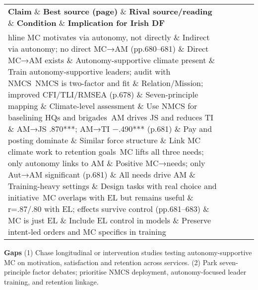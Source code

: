  
\begin{tabular}{p{3.2cm}p{4.2cm}p{3.6cm}p{3.2cm}p{4.2cm}}
	\textbf{Claim} \& \textbf{Best source (page)} \& \textbf{Rival source/reading} \& \textbf{Condition} \& \textbf{Implication for Irish DF}\\hline
	MC motivates via autonomy, not directly \& Indirect via autonomy; no direct MC→AM (pp.680–681) \& Direct MC→AM exists \& Autonomy-supportive climate present \& Train autonomy-supportive leaders; audit with NMCS\
	NMCS is two-factor and fit \& Relation/Mission; improved CFI/TLI/RMSEA (p.678) \& Seven-principle mapping \& Climate-level assessment \& Use NMCS for baselining HQs and brigades\
	AM drives JS and reduces TI \& AM→JS .870***; AM→TI −.490*** (p.681) \& Pay and posting dominate \& Similar force structure \& Link MC climate work to retention goals\
	MC lifts all three needs; only autonomy links to AM \& Positive MC→needs; only Aut→AM significant (p.681) \& All needs drive AM \& Training-heavy settings \& Design tasks with real choice and initiative\
	MC overlaps with EL but remains useful \& r=.87/.80 with EL; effects survive control (pp.681–683) \& MC is just EL \& Include EL control in models \& Preserve intent-led orders and MC specifics in training\
\end{tabular}

\textbf{Gaps}
(1) Chase longitudinal or intervention studies testing autonomy-supportive MC on motivation, satisfaction and retention across services.
(2) Park seven-principle factor debates; prioritise NMCS deployment, autonomy-focused leader training, and retention linkage.

\parencite{KOHN_2024}

